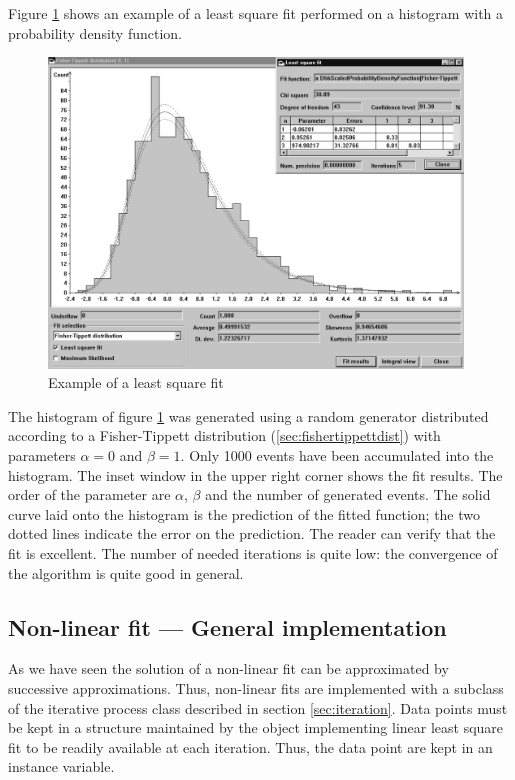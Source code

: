 Figure \ref{fig:lsfExample} shows an example of a least square fit
performed on a histogram with a probability density function.
\begin{figure}
\centering\includegraphics[width=11cm]{Figures/LeastSquareFit}
\caption{Example of a least square fit}\label{fig:lsfExample}
\end{figure}
The histogram of figure \ref{fig:lsfExample} was generated using a
random generator distributed according to a Fisher-Tippett
distribution (\cf \ref{sec:fishertippettdist}) with parameters
$\alpha = 0$ and $\beta=1$. Only 1000 events have been accumulated
into the histogram. The inset window in the upper right corner
shows the fit results. The order of the parameter are $\alpha$,
$\beta$ and the number of generated events. The solid curve laid
onto the histogram is the prediction of the fitted function; the
two dotted lines indicate the error on the prediction. The reader
can verify that the fit is excellent. The number of needed
iterations is quite low: the convergence of the algorithm is quite
good in general.

\subsection{Non-linear fit --- General implementation}
 As we have seen the solution of a
non-linear fit can be approximated by successive approximations.
Thus, non-linear fits are implemented with a subclass of the
iterative process class described in section \ref{sec:iteration}.
Data points must be kept in a structure maintained by the object
implementing linear least square fit to be readily available at
each iteration. Thus, the data point are kept in an instance
variable.

